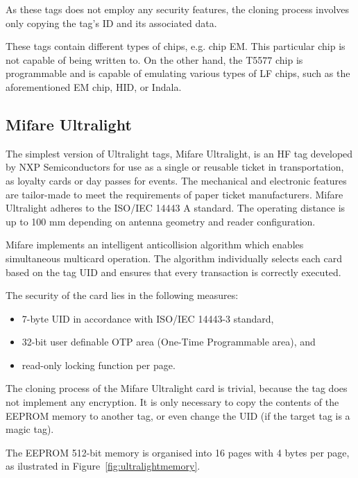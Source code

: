 As these tags does not employ any security features, the cloning process involves only copying the tag's ID and its associated data.~\cite{koscher2009EPC}

These tags contain different types of chips, e.g. chip EM. This particular chip is not capable of being written to. On the other hand, the T5577 chip is programmable and is capable of emulating various types of LF chips, such as the aforementioned EM chip, HID, or Indala.~\cite{lfchipsforum}


\subsection{Mifare Ultralight}

The simplest version of Ultralight tags, Mifare Ultralight, is an HF tag developed by NXP Semiconductors for use as a single or reusable ticket in transportation, as loyalty cards or day passes for events. The mechanical and electronic features are tailor-made to meet the requirements of paper ticket manufacturers. Mifare Ultralight adheres to the ISO/IEC 14443 A standard. The operating distance is up to 100 mm depending on antenna geometry and reader configuration.~\cite{ultralightdatasheet}

Mifare implements an intelligent anticollision algorithm which enables simultaneous multicard operation. The algorithm individually selects each card based on the tag UID and ensures that every transaction is correctly executed.~\cite{ultralightdatasheet}

The security of the card lies in the following measures:

\begin{itemize}
    \item  7-byte UID in accordance with ISO/IEC 14443-3 standard,
    \item 32-bit user definable OTP area (One-Time Programmable area), and
    \item read-only locking function per page.
\end{itemize}
The cloning process of the Mifare Ultralight card is trivial, because the tag does not implement any encryption. It is only necessary to copy the contents of the EEPROM memory to another tag, or even change the UID (if the target tag is a magic tag).~\cite{ultralightdatasheet, preucil2023surveying}

The EEPROM 512-bit memory is organised into 16 pages with 4 bytes per page, as ilustrated in Figure~\ref{fig:ultralightmemory}.~\cite{ultralightdatasheet}

